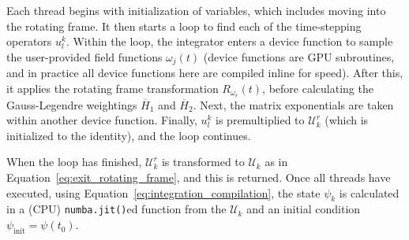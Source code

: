 \documentclass{jors}
\begin{document}
		Each thread begins with initialization of variables, which includes moving into the rotating frame.
		It then starts a loop to find each of the time-stepping operators $ u^k_l $.
		Within the loop, the integrator enters a device function to sample the user-provided field functions $ \omega_j(t) $ (device functions are GPU subroutines, and in practice all device functions here are compiled inline for speed).
		After this, it applies the rotating frame transformation $R_{\omega_r}(t)$, before calculating the Gauss-Legendre weightings $ \overline{H}_1 $ and $ \overline{H}_2 $. Next, the matrix exponentials are taken within another device function.
		Finally, $ u^k_l $ is premultiplied to $ \mathcal{U}^r_k $ (which is initialized to the identity), and the loop continues.
		
		When the loop has finished, $ \mathcal{U}^r_k $ is transformed to $ \mathcal{U}_k $ as in Equation~\eqref{eq:exit_rotating_frame}, and this is returned.
		Once all threads have executed, using Equation~\eqref{eq:integration_compilation}, the state $ \psi_k $ is calculated in a (CPU) \texttt{numba.jit()}ed function from the $ \mathcal{U}_k $ and an initial condition $ \psi_{\mathrm{init}} = \psi(t_0) $.
\end{document}
